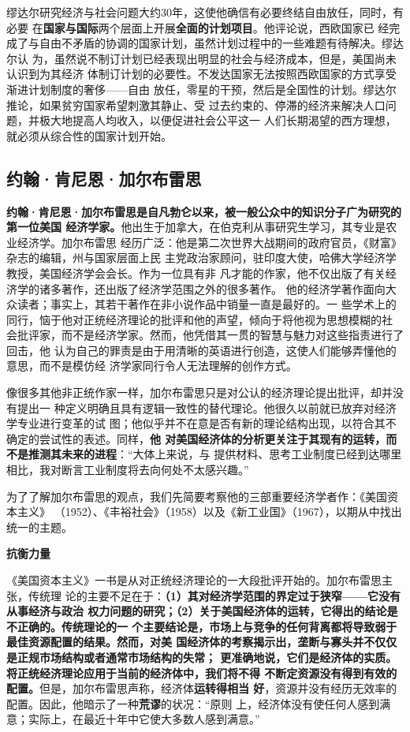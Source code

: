 缪达尔研究经济与社会问题大约30年，这使他确信有必要终结自由放任，同时，有必要
在\textbf{国家与国际}两个层面上开展\textbf{全面的计划项目}。他评论说，西欧国家已
经完成了与自由不矛盾的协调的国家计划，虽然计划过程中的一些难题有待解决。缪达尔认
为，虽然说不制订计划已经表现出明显的社会与经济成本，但是，美国尚未认识到为其经济
体制订计划的必要性。不发达国家无法按照西欧国家的方式享受渐进计划制度的奢侈——自由
放任，零星的干预，然后是全国性的计划。缪达尔推论，如果贫穷国家希望刺激其静止、受
过去约束的、停滞的经济来解决人口问题，并极大地提高人均收入，以便促进社会公平这一
人们长期渴望的西方理想，就必须从综合性的国家计划开始。

\subsection{约翰·肯尼恩·加尔布雷思}

\textbf{约翰·肯尼恩·加尔布雷思是自凡勃仑以来，被一般公众中的知识分子广为研究的第一位美国
经济学家。}他出生于加拿大，在伯克利从事研究生学习，其专业是农业经济学。加尔布雷思
经历广泛：他是第二次世界大战期间的政府官员，《财富》杂志的编辑，州与国家层面上民
主党政治家顾问，驻印度大使，哈佛大学经济学教授，美国经济学会会长。作为一位具有非
凡才能的作家，他不仅出版了有关经济学的诸多著作，还出版了经济学范围之外的很多著作。
他的经济学著作面向大众读者；事实上，其若干著作在非小说作品中销量一直是最好的。一
些学术上的同行，恼于他对正统经济理论的批评和他的声望，倾向于将他视为思想模糊的社
会批评家，而不是经济学家。然而，他凭借其一贯的智慧与魅力对这些指责进行了回击，他
认为自己的罪责是由于用清晰的英语进行创造，这使人们能够弄懂他的意思，而不是模仿经
济学家同行令人无法理解的创作方式。

像很多其他非正统作家一样，加尔布雷思只是对公认的经济理论提出批评，却并没有提出一
种定义明确且具有逻辑一致性的替代理论。他很久以前就已放弃对经济学专业进行变革的试
图；他似乎并不在意是否有新的理论结构出现，以符合其不确定的尝试性的表述。同样，\textbf{他
对美国经济体的分析更关注于其现有的运转，而不是推测其未来的进程}：“大体上来说，与
提供材料、思考工业制度已经到达哪里相比，我对断言工业制度将去向何处不太感兴趣。”

为了了解加尔布雷思的观点，我们先简要考察他的三部重要经济学者作：《美国资本主义》
（1952）、《丰裕社会》（1958）以及《新工业国》（1967），以期从中找出统一的主题。

\textbf{\sffamily 抗衡力量}

《美国资本主义》一书是从对正统经济理论的一大段批评开始的。加尔布雷思主张，传统理
论的主要不足在于：\textbf{（1）其对经济学范围的界定过于狭窄——它没有从事经济与政治
  权力问题的研究；（2）关于美国经济体的运转，它得出的结论是不正确的。传统理论的一
  个主要结论是，市场上与竞争的任何背离都将导致弱于最佳资源配置的结果。然而，对美
  国经济体的考察揭示出，垄断与寡头并不仅仅是正规市场结构或者通常市场结构的失常；
  更准确地说，它们是经济体的实质。将正统经济理论应用于当前的经济体中，我们将不得
  不断定资源没有得到有效的配置。}但是，加尔布雷思声称，经济体\textbf{运转得相当
  好}，资源并没有经历无效率的配置。因此，他暗示了一种\textbf{荒谬}的状况：“原则
上，经济体没有使任何人感到满意；实际上，在最近十年中它使大多数人感到满意。”


